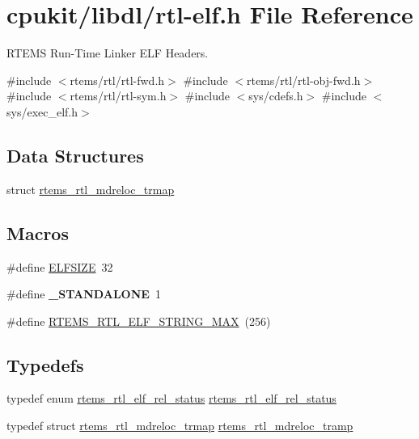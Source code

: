 \hypertarget{rtl-elf_8h}{}\section{cpukit/libdl/rtl-\/elf.h File Reference}
\label{rtl-elf_8h}


R\+T\+E\+MS Run-\/\+Time Linker E\+LF Headers.  


{\ttfamily \#include $<$rtems/rtl/rtl-\/fwd.\+h$>$}\newline
{\ttfamily \#include $<$rtems/rtl/rtl-\/obj-\/fwd.\+h$>$}\newline
{\ttfamily \#include $<$rtems/rtl/rtl-\/sym.\+h$>$}\newline
{\ttfamily \#include $<$sys/cdefs.\+h$>$}\newline
{\ttfamily \#include $<$sys/exec\+\_\+elf.\+h$>$}\newline
\subsection*{Data Structures}
\begin{DoxyCompactItemize}
\item 
struct \mbox{\hyperlink{structrtems__rtl__mdreloc__trmap}{rtems\+\_\+rtl\+\_\+mdreloc\+\_\+trmap}}
\end{DoxyCompactItemize}
\subsection*{Macros}
\begin{DoxyCompactItemize}
\item 
\#define \mbox{\hyperlink{rtl-elf_8h_a3f81993a8a64147f5eb005b3c5351455}{E\+L\+F\+S\+I\+ZE}}~32
\item 
\mbox{\label{rtl-elf_8h_a02b0264decff61a3e973ddb4645258fd}} 
\#define {\bfseries \+\_\+\+S\+T\+A\+N\+D\+A\+L\+O\+NE}~1
\item 
\#define \mbox{\hyperlink{rtl-elf_8h_a9fb1485c239041baebe15f93bab01fca}{R\+T\+E\+M\+S\+\_\+\+R\+T\+L\+\_\+\+E\+L\+F\+\_\+\+S\+T\+R\+I\+N\+G\+\_\+\+M\+AX}}~(256)
\end{DoxyCompactItemize}
\subsection*{Typedefs}
\begin{DoxyCompactItemize}
\item 
typedef enum \mbox{\hyperlink{rtl-elf_8h_a97d7ca039fc1123f4ca0c7b43d4a811f}{rtems\+\_\+rtl\+\_\+elf\+\_\+rel\+\_\+status}} \mbox{\hyperlink{rtl-elf_8h_a2e417b11a8da689fc4be1d81b94b9817}{rtems\+\_\+rtl\+\_\+elf\+\_\+rel\+\_\+status}}
\item 
typedef struct \mbox{\hyperlink{structrtems__rtl__mdreloc__trmap}{rtems\+\_\+rtl\+\_\+mdreloc\+\_\+trmap}} \mbox{\hyperlink{rtl-elf_8h_ad711d76aa58e3b5c7380face8f4a5f67}{rtems\+\_\+rtl\+\_\+mdreloc\+\_\+tramp}}
\end{DoxyCompactItemize}
